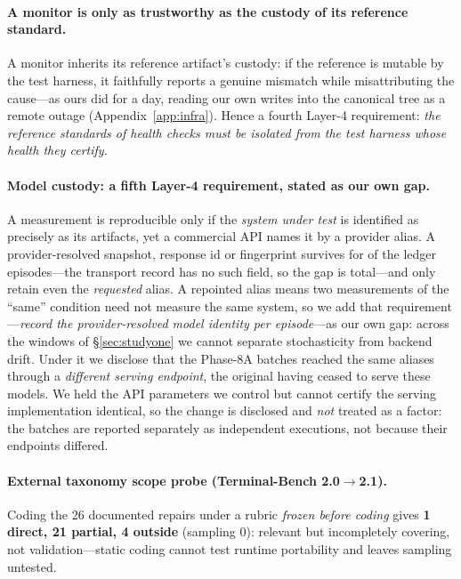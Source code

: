 \documentclass{article}
\begin{document}
\paragraph{A monitor is only as trustworthy as the custody of its reference standard.} A monitor inherits its reference artifact's custody: if the reference is mutable by the test harness, it faithfully reports a genuine mismatch while misattributing the cause---as ours did for a day, reading our own writes into the canonical tree as a remote outage (Appendix~\ref{app:infra}). Hence a fourth Layer-4 requirement: \emph{the reference standards of health checks must be isolated from the test harness whose health they certify.}


\paragraph{Model custody: a fifth Layer-4 requirement, stated as our own gap.} A measurement is reproducible only if the \emph{system under test} is identified as precisely as its artifacts, yet a commercial API names it by a provider alias. A provider-resolved snapshot, response id or fingerprint survives for \StatSnapshotEpisodes{} of the \StatLedgerEpisodes{} ledger episodes---the transport record has no such field, so the gap is total---and only \StatDiagEpisodes{} retain even the \emph{requested} alias. A repointed alias means two measurements of the ``same'' condition need not measure the same system, so we add that requirement---\emph{record the provider-resolved model identity per episode}---as our own gap: across the windows of \S\ref{sec:studyone} we cannot separate stochasticity from backend drift. Under it we disclose that the Phase-8A batches reached the same aliases through a \emph{different serving endpoint}, the original having ceased to serve these models. We held the API parameters we control but cannot certify the serving implementation identical, so the change is disclosed and \emph{not} treated as a factor: the batches are reported separately as independent executions, not because their endpoints differed.

\paragraph{External taxonomy scope probe (Terminal-Bench 2.0$\to$2.1).} Coding the 26 documented repairs under a rubric \emph{frozen before coding} gives \textbf{1 direct, 21 partial, 4 outside} (sampling 0): relevant but incompletely covering, not validation---static coding cannot test runtime portability and leaves sampling untested.
\end{document}
